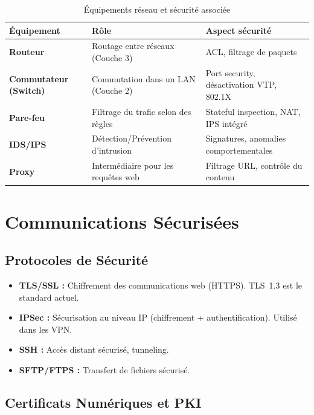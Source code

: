 \begin{table}[H]
\centering
\small
\begin{tabular}{p{3cm}p{4cm}p{5cm}}
    \toprule
    \textbf{Équipement} & \textbf{Rôle} & \textbf{Aspect sécurité} \\
    \midrule
    \textbf{Routeur}    & Routage entre réseaux (Couche 3) & ACL, filtrage de paquets \\
    \textbf{Commutateur (Switch)} & Commutation dans un LAN (Couche 2) & Port security, désactivation VTP, 802.1X \\
    \textbf{Pare-feu}   & Filtrage du trafic selon des règles & Stateful inspection, NAT, IPS intégré \\
    \textbf{IDS/IPS}    & Détection/Prévention d'intrusion & Signatures, anomalies comportementales \\
    \textbf{Proxy}      & Intermédiaire pour les requêtes web & Filtrage URL, contrôle du contenu \\
    \bottomrule
\end{tabular}
\caption{Équipements réseau et sécurité associée}
\end{table}

\section{Communications Sécurisées}

\subsection{Protocoles de Sécurité}

\begin{itemize}
    \item \textbf{TLS/SSL :} Chiffrement des communications web (HTTPS). TLS~1.3 est le standard actuel.
    \item \textbf{IPSec :} Sécurisation au niveau IP (chiffrement + authentification). Utilisé dans les VPN.
    \item \textbf{SSH :} Accès distant sécurisé, tunneling.
    \item \textbf{SFTP/FTPS :} Transfert de fichiers sécurisé.
\end{itemize}

\subsection{Certificats Numériques et PKI}

